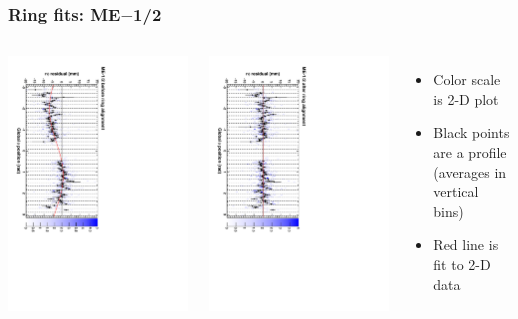 \documentclass[compress]{beamer}
\begin{document}
\begin{frame}
\frametitle{Ring fits: ME$-$1/2}
\vfill
\begin{columns}
\includegraphics[height=\linewidth, angle=90]{ringfits_before/mem12.pdf}

\includegraphics[height=\linewidth, angle=90]{ringfits_after/mem12.pdf}
\begin{itemize}
\item Color scale is 2-D plot
\item Black points are a profile (averages in vertical bins)
\item Red line is fit to 2-D data
\end{itemize}
\end{columns}
\end{frame}
\end{document}
